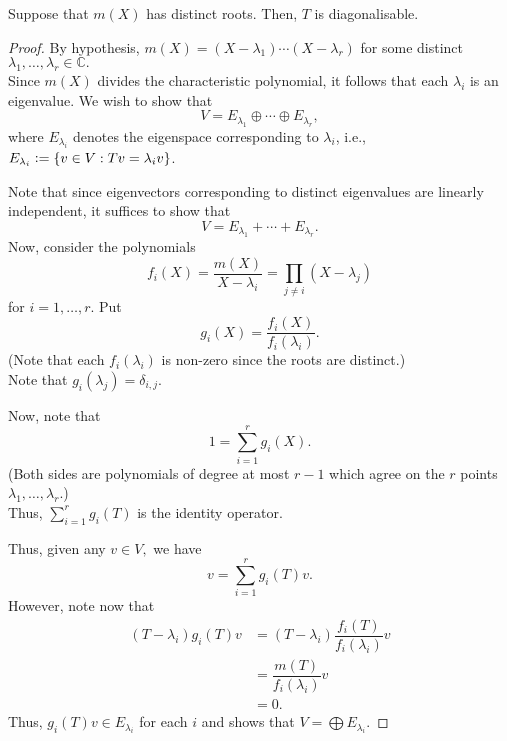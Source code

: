 \begin{prop}
	Suppose that $m(X)$ has distinct roots. Then, $T$ is diagonalisable.
\end{prop}
\begin{proof} 
	By hypothesis, $m(X) = (X - \lambda_1)\cdots(X - \lambda_r)$ for some distinct $\lambda_1, \ldots, \lambda_r \in \mathbb{C}.$\\
	Since $m(X)$ divides the characteristic polynomial, it follows that each $\lambda_i$ is an eigenvalue. We wish to show that
	\begin{equation*} 
		V = E_{\lambda_1} \oplus \cdots \oplus E_{\lambda_r},
	\end{equation*}
	where $E_{\lambda_i}$ denotes the eigenspace corresponding to $\lambda_i$, i.e., $E_{\lambda_i} \vcentcolon= \{v \in V : Tv = \lambda_{i} v\}$.

	Note that since eigenvectors corresponding to distinct eigenvalues are linearly independent, it suffices to show that
	\begin{equation*} 
		V = E_{\lambda_1} + \cdots + E_{\lambda_r}.
	\end{equation*}
	Now, consider the polynomials
	\begin{equation*} 
		f_i(X) = \dfrac{m(X)}{X - \lambda_i} = \prod_{j \neq i}(X - \lambda_j)
	\end{equation*}
	for $i = 1, \ldots, r.$ Put
	\begin{equation*} 
		g_i(X) = \dfrac{f_i(X)}{f_i(\lambda_i)}.
	\end{equation*}
	(Note that each $f_i(\lambda_i)$ is non-zero since the roots are distinct.)\\
	Note that $g_i(\lambda_j) = \delta_{i, j}.$

	Now, note that
	\begin{equation*} 
		1 = \sum_{i = 1}^{r} g_i(X).
	\end{equation*}
	(Both sides are polynomials of degree at most $r - 1$ which agree on the $r$ points $\lambda_1, \ldots, \lambda_r.$)\\
	Thus, $\sum_{i = 1}^{r} g_i(T)$ is the identity operator.

	Thus, given any $v \in V,$ we have
	\begin{equation} \tag{$\sum$} \label{eq:sumeigenvectors}
		v = \sum_{i = 1}^{r} g_i(T)v.
	\end{equation}
	However, note now that
	\begin{align*} 
		(T - \lambda_i)g_i(T)v &= (T - \lambda_i)\dfrac{f_i(T)}{f_i(\lambda_i)}v\\
		&= \dfrac{m(T)}{f_i(\lambda_i)}v\\
		&= 0.
	\end{align*}
	Thus, $g_i(T)v \in E_{\lambda_i}$ for each $i$ and  shows that $V = \bigoplus E_{\lambda_i}.$ 
\end{proof}	

